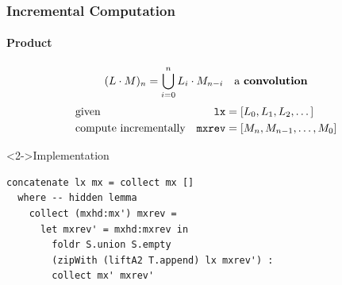 \documentclass[pdftex,aspectratio=169]{beamer}
\begin{document}
\begin{frame}[fragile]
  \frametitle{Incremental Computation}
  \framesubtitle{Product}
  \vspace{-2.5\baselineskip}
  \begin{align*}
    (L \cdot M)_n & = \bigcup_{i=0}^n L_i \cdot M_{n-i} & \text{a \textbf{convolution}}
  \end{align*}
  \begin{align*}
    & \text{given} & \code{lx} &= [L_0, L_1, L_2, \dots ]\\
     & \text{compute incrementally} &
    \code{mxrev} &= [M_n, M_{n-1}, \dots , M_0]
  \end{align*}
  \begin{block}<2->{Implementation}
\begin{lstlisting}[numbers=none]
concatenate lx mx = collect mx []
  where -- hidden lemma
    collect (mxhd:mx') mxrev =
      let mxrev' = mxhd:mxrev in
        foldr S.union S.empty 
        (zipWith (liftA2 T.append) lx mxrev') :
        collect mx' mxrev'
\end{lstlisting}
  \end{block}
\end{frame}
\end{document}
